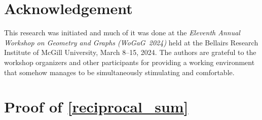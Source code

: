 \documentclass{patmorin}
\begin{document}
\section*{Acknowledgement}

This research was initiated and much of it was done at the \emph{Eleventh Annual Workshop on Geometry and Graphs (WoGaG~2024)} held at the Bellairs Research Institute of McGill University, March 8--15, 2024. The authors are grateful to the workshop organizers and other participants for providing a working environment that somehow manages to be simultaneously stimulating and comfortable.





\appendix

\section{Proof of \cref{reciprocal_sum}}
\label{reciprocal_sum_section}


\reciprocalsum*
\end{document}
